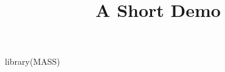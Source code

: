 \documentclass[article]{jss}
\title{A Short Demo}
\begin{document}
\begin{CodeInput}
library(MASS)
\end{CodeInput}
\end{document}
